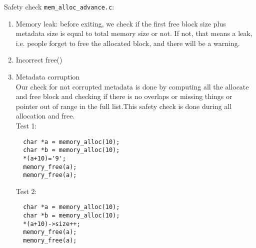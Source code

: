 \documentclass{article}
\begin{document}
\begin{flushleft}
Safety check \texttt{mem_alloc_advance.c}:

\begin{enumerate}
\item Memory leak: before exiting, we check if the first free block size plus metadata size is equal to total memory size or not. If not, that means a leak, i.e. people forget to free the allocated block, and there will be a warning.

\item Incorrect free()

\item Metadata corruption\\
Our check for not corrupted metadata is done by computing all the allocate and free block and checking if there is no overlaps or missing things or pointer out of range in the full list.This safety check is done during all allocation and free.\\
Test 1:\\
\begin{lstlisting}
  char *a = memory_alloc(10);
  char *b = memory_alloc(10);
  *(a+10)='9';
  memory_free(a);
  memory_free(a);
\end{lstlisting}
Test 2:\\
\begin{lstlisting}
  char *a = memory_alloc(10);
  char *b = memory_alloc(10);
  *(a+10)->size++;
  memory_free(a);
  memory_free(a);
\end{lstlisting}

\end{enumerate}


\end{flushleft}
\end{document}
